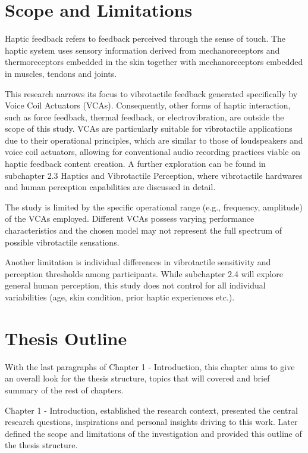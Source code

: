     \section{Scope and Limitations}
        Haptic feedback refers to feedback perceived through the sense of touch. The haptic system uses sensory information derived from mechanoreceptors and thermoreceptors embedded in the skin together with mechanoreceptors embedded in muscles, tendons and joints\cite{Haptic_Perception-A_Tutorial}.\par 

        This research narrows its focus to vibrotactile feedback generated specifically by Voice Coil Actuators (VCAs). Consequently, other forms of haptic interaction, such as force feedback, thermal feedback, or electrovibration, are outside the scope of this study. VCAs are particularly suitable for vibrotactile applications due to their operational principles, which are similar to those of loudspeakers and voice coil actuators\cite{Audio-Tactile_Rendering}, allowing for conventional audio recording practices viable on haptic feedback content creation. A further exploration can be found in subchapter 2.3 Haptics and Vibrotactile Perception, where vibrotactile hardwares and human perception capabilities are discussed in detail.\par 

        The study is limited by the specific operational range (e.g., frequency, amplitude) of the VCAs employed. Different VCAs possess varying performance characteristics and the chosen model may not represent the full spectrum of possible vibrotactile sensations.\par

        Another limitation is individual differences in vibrotactile sensitivity and perception thresholds among participants. While subchapter 2.4 will explore general human perception, this study does not control for all individual variabilities (age, skin condition, prior haptic experiences etc.).\par
    \section{Thesis Outline}
        With the last paragraphs of Chapter 1 - Introduction, this chapter aims to give an overall look for the thesis structure, topics that will covered and brief summary of the rest of chapters.\par

        Chapter 1 - Introduction, established the research context, presented the central research questions, inspirations and personal insights driving to this work. Later defined the scope and limitations of the investigation and provided this outline of the thesis structure.\par

